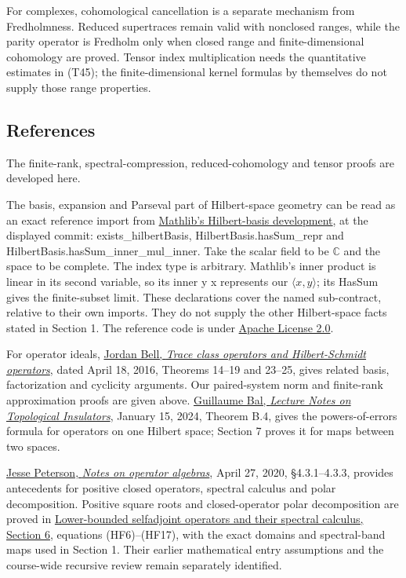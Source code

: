 \documentclass[
  11pt,
]{article}
\begin{document}
For complexes, cohomological cancellation is a separate mechanism from
Fredholmness. Reduced supertraces remain valid with nonclosed ranges,
while the parity operator is Fredholm only when closed range and
finite-dimensional cohomology are proved. Tensor index multiplication
needs the quantitative estimates in (T45); the finite-dimensional kernel
formulas by themselves do not supply those range properties.

\subsection{References}\label{references}

The finite-rank, spectral-compression, reduced-cohomology and tensor
proofs are developed here.

The basis, expansion and Parseval part of Hilbert-space geometry can be
read as an exact reference import from
\href{https://github.com/leanprover-community/mathlib4/blob/71a80585ee495fc24472fd0eaffc89d94e4fd8d6/Mathlib/Analysis/InnerProductSpace/l2Space.lean}{Mathlib's
Hilbert-basis development}, at the displayed commit:
exists\_hilbertBasis, HilbertBasis.hasSum\_repr and
HilbertBasis.hasSum\_inner\_mul\_inner. Take the scalar field to be
\(\mathbb C\) and the space to be complete. The index type is arbitrary.
Mathlib's inner product is linear in its second variable, so its inner y
x represents our \(\langle x,y\rangle\); its HasSum gives the
finite-subset limit. These declarations cover the named sub-contract,
relative to their own imports. They do not supply the other
Hilbert-space facts stated in Section 1. The reference code is under
\href{https://github.com/leanprover-community/mathlib4/blob/71a80585ee495fc24472fd0eaffc89d94e4fd8d6/LICENSE}{Apache
License 2.0}.

For operator ideals,
\href{https://jordanbell.info/LaTeX/mathematics/traceclass/traceclass.pdf}{Jordan
Bell, \emph{Trace class operators and Hilbert-Schmidt operators}}, dated
April 18, 2016, Theorems 14--19 and 23--25, gives related basis,
factorization and cyclicity arguments. Our paired-system norm and
finite-rank approximation proofs are given above.
\href{https://www.stat.uchicago.edu/~guillaumebal/COURSES/Lecture-Notes-TPM.pdf}{Guillaume
Bal, \emph{Lecture Notes on Topological Insulators}}, January 15, 2024,
Theorem B.4, gives the powers-of-errors formula for operators on one
Hilbert space; Section 7 proves it for maps between two spaces.

\href{https://math.vanderbilt.edu/peters10/teaching/spring2020/OperatorAlgebras.pdf}{Jesse
Peterson, \emph{Notes on operator algebras}}, April 27, 2020,
§4.3.1--4.3.3, provides antecedents for positive closed operators,
spectral calculus and polar decomposition. Positive square roots and
closed-operator polar decomposition are proved in
\href{lower-bounded-spectral-calculus.pdf}{Lower-bounded
selfadjoint operators and their spectral calculus, Section 6}, equations
(HF6)--(HF17), with the exact domains and spectral-band maps used in
Section 1. Their earlier mathematical entry assumptions and the
course-wide recursive review remain separately identified.
\end{document}
